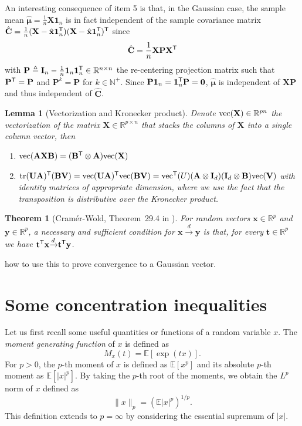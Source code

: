 \documentclass[MAL,biber]{nowfnt} %
\newcommand{\RED}{\color[rgb]{0.70,0,0}}
\newtheorem{Theorem}{Theorem}
\newtheorem{Lemma}{Lemma}
\newcommand{\T}{{\sf T}}
\DeclareMathOperator{\tr}{tr}
\renewcommand{\vec}{{\rm vec}}
\newcommand{\cd}{{ \xrightarrow{d} }}
\newcommand{\A}{{\mathbf{A}}}
\newcommand{\B}{{\mathbf{B}}}
\newcommand{\C}{{\mathbf{C}}}
\newcommand{\I}{{\mathbf{I}}}
\renewcommand{\P}{{\mathbf{P}}}
\newcommand{\U}{{\mathbf{U}}}
\newcommand{\V}{{\mathbf{V}}}
\newcommand{\X}{{\mathbf{X}}}
\renewcommand{\t}{{\mathbf{t}}}
\newcommand{\x}{{\mathbf{x}}}
\newcommand{\y}{{\mathbf{y}}}
\newcommand{\bmu}{{ \boldsymbol{\mu} }}
\newcommand{\zo}{{\mathbf{0}}}
\newcommand{\one}{{\mathbf{1}}}
\newcommand{\RR}{{\mathbb{R}}}
\newcommand{\EE}{{\mathbb{E}}}
\begin{document}
An interesting consequence of item 5 is that, in the Gaussian case, the sample mean $\hat \bmu = \frac1n \X \one_n$ is in fact independent of the sample covariance matrix $\hat \C = \frac1n (\X - \hat \x \one_n^\T) (\X - \hat \x \one_n^\T)^\T$ since 
\[
	\hat \C = \frac1n \X \P \X^\T
\]
with $\P \triangleq \I_n - \frac1n \one_n \one_n^\T \in \RR^{n \times n}$ the re-centering projection matrix such that $\P^\T = \P$ and $\P^k = \P$ for $k \in \mathbb{N}^+$. Since $\P \one_n = \one_n^\T \P = \zo$, $\hat \bmu$ is independent of $\X \P$ and thus independent of $\hat \C$.

\begin{Lemma}[Vectorization and Kronecker product]\label{lemma:vec-Kronecker}
Denote $\vec(\X) \in \RR^{pn}$ the vectorization of the matrix $\X \in \RR^{p \times n}$ that stacks the columns of $\X$ into a single column vector, then
\begin{enumerate}
	\item $\vec(\A \X \B) = (\B^\T \otimes \A) \vec(\X)$ 
	\item $\tr (\U \A)^\T (\B \V) = \vec(\U \A)^\T \vec(\B \V) = \vec^\T(U) (\A \otimes \I_d) (\I_d \otimes \B) \vec(\V)$ with identity matrices of appropriate dimension, where we use the fact that the transposition is distributive over the Kronecker product.
\end{enumerate}
\end{Lemma}

\begin{Theorem}[Cram{\'e}r-Wold, Theorem~29.4 in \citep{billingsley2012probability}]
For random vectors $\x \in \RR^p$ and $\y \in \RR^p$, a necessary and sufficient condition for $\x \cd \y$ is that, for every $\t \in \RR^p$ we have $\t^\T \x \cd \t^\T \y$.
\end{Theorem}
{\RED how to use this to prove convergence to a Gaussian vector.}


\chapter{Some concentration inequalities}
Let us first recall some useful quantities or functions of a random variable $x$. The \emph{moment generating function} of $x$ is defined as
\[
	M_x(t) = \EE[\exp(tx)].
\]
For $p > 0$, the $p$-th moment of $x$ is defined as $\EE[x^p]$ and its absolute $p$-th moment as $\EE[|x|^p]$. By taking the $p$-th root of the moments, we obtain the $L^p$ norm of $x$ defined as
\[
	\| x \|_p = \left( \EE |x|^p \right)^{1/p}.
\]
This definition extends to $p = \infty$ by considering the essential supremum of $|x|$.
\end{document}
